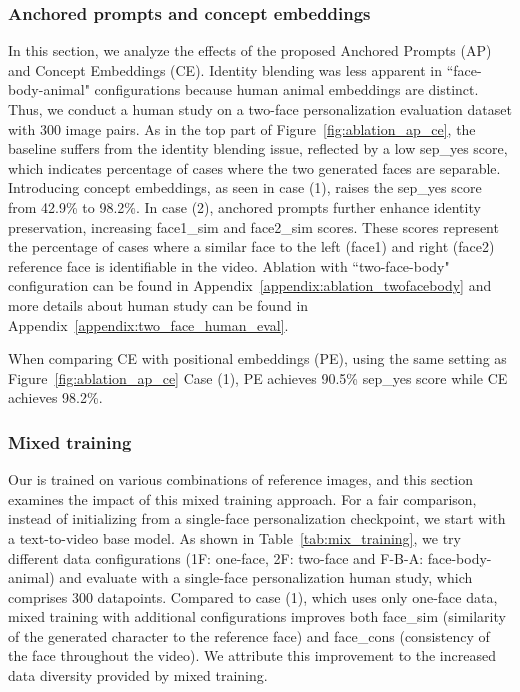 \subsubsection{Anchored prompts and concept embeddings}
\label{sec:ablation_ap_ce}
In this section, we analyze the effects of the proposed Anchored Prompts (AP) and Concept Embeddings (CE). 
Identity blending was less apparent in ``face-body-animal" configurations because human animal embeddings are distinct. 
Thus, we conduct a human study on a two-face personalization evaluation dataset with 300 image pairs.
As in the top part of Figure~\ref{fig:ablation_ap_ce}, the baseline suffers from the identity blending issue, reflected by a low sep\_yes score, which indicates percentage of cases where the two generated faces are separable. 
Introducing concept embeddings, as seen in case (1), raises the sep\_yes score from 42.9\% to 98.2\%.
In case (2), anchored prompts further enhance identity preservation, increasing face1\_sim and face2\_sim scores. These scores represent the percentage of cases where a similar face to the left (face1) and right (face2) reference face is identifiable in the video.
Ablation with ``two-face-body" configuration can be found in  Appendix~\ref{appendix:ablation_twofacebody} and more details about human study can be found in Appendix~\ref{appendix:two_face_human_eval}.

When comparing CE with positional embeddings (PE), using the same setting as Figure~\ref{fig:ablation_ap_ce} Case (1), PE achieves 90.5\% sep\_yes score while CE achieves 98.2\%.




\subsubsection{Mixed training}
\label{sec:mix_training}

Our \workname is trained on various combinations of reference images, and this section examines the impact of this mixed training approach.
For a fair comparison, instead of initializing from a single-face personalization checkpoint, we start with a text-to-video base model.
As shown in Table~\ref{tab:mix_training}, we try different data configurations (1F: one-face, 2F: two-face and F-B-A: face-body-animal) and evaluate with a single-face personalization human study, which comprises 300 datapoints.
Compared to case (1), which uses only one-face data, mixed training with additional configurations improves both face\_sim (similarity of the generated character to the reference face) and face\_cons (consistency of the face throughout the video). 
We attribute this improvement to the increased data diversity provided by mixed training.



